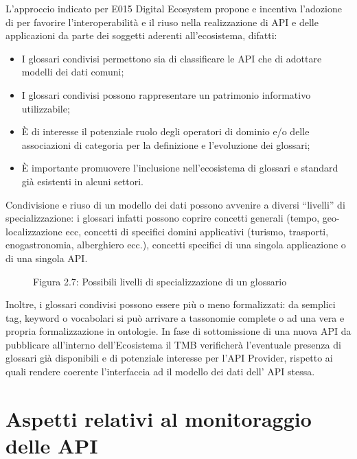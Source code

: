 \documentclass[letterpaper,10pt,italian]{sphinxmanual}
\begin{document}
L’approccio indicato per E015 Digital Ecosystem propone e incentiva l’adozione di  per favorire l’interoperabilità e il riuso nella realizzazione di API e delle applicazioni da parte dei soggetti aderenti all’ecosistema, difatti:
\begin{itemize}
\item {} 
I glossari condivisi permettono sia di classificare le API che di adottare modelli dei dati comuni;

\item {} 
I glossari condivisi possono rappresentare un patrimonio informativo utilizzabile;

\item {} 
È di interesse il potenziale ruolo degli operatori di dominio e/o delle associazioni di categoria per la definizione e l’evoluzione dei glossari;

\item {} 
È importante promuovere l’inclusione nell’ecosistema di glossari e standard già esistenti in alcuni settori.

\end{itemize}

Condivisione e riuso di un modello dei dati possono avvenire a diversi “livelli” di specializzazione: i glossari infatti possono coprire concetti generali (tempo, geo-localizzazione ecc, concetti di specifici domini applicativi (turismo, trasporti, enogastronomia, alberghiero ecc.), concetti specifici di una singola applicazione o di una singola API.

\begin{figure}[htbp]
\centering
\capstart

\noindent{}
\caption{Figura 2.7: Possibili livelli di specializzazione di un glossario}\label{\detokenize{sez23:id2}}\end{figure}

Inoltre, i glossari condivisi possono essere più o meno formalizzati: da semplici tag, keyword o vocabolari si può arrivare a tassonomie complete o ad una vera e propria formalizzazione in ontologie.
In fase di sottomissione di una nuova API da pubblicare all’interno dell’Ecosistema il TMB verificherà l’eventuale presenza di glossari già disponibili e di potenziale interesse per l’API Provider, rispetto ai quali rendere coerente l’interfaccia ad il modello dei dati dell’ API stessa.


\section{Aspetti relativi al monitoraggio delle API}
\label{\detokenize{sez24:aspetti-relativi-al-monitoraggio-delle-api}}\label{\detokenize{sez24::doc}}\label{\detokenize{sez24:sezione24}}
\end{document}
